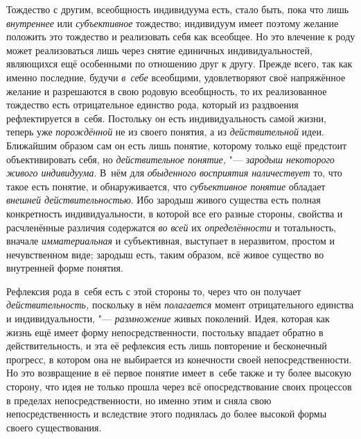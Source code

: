 Тождество с другим, всеобщность индивидуума есть, стало быть,
пока что лишь {\em внутреннее}
или {\em субъективное}
тождество; индивидуум имеет поэтому желание положить это
тождество и реализовать себя как всеобщее. Но это влечение к роду может
реализоваться лишь через снятие единичных индивидуальностей, являющихся ещё
особенными по отношению друг к другу. Прежде всего, так как именно
последние, будучи {\em в~себе}
всеобщими, удовлетворяют своё напряжённое желание и
разрешаются в свою родовую всеобщность, то их реализованное тождество есть
отрицательное единство рода, который из раздвоения рефлектируется в~себя.
Постольку он есть индивидуальность самой жизни, теперь уже
{\em порождённой} не из
своего понятия, а из
{\em действительной}
идеи. Ближайшим образом сам он есть лишь
понятие, которому только ещё предстоит объективировать себя, но
{\em действительное понятие,} "---
{\em зародыш некоторого живого
индивидуума}. В~нём для
{\em обыденного восприятия
наличествует} то, что такое есть понятие, и обнаруживается,
что {\em субъективное понятие}
обладает {\em внешней
действительностью}. Ибо зародыш живого существа есть полная
конкретность индивидуальности, в которой все его разные стороны, свойства и
расчленённые различия содержатся {\em во
всей} их
{\em определённости} и
тотальность, вначале
{\em имматериальная} и
субъективная, выступает в неразвитом, простом и нечувственном виде; зародыш
есть, таким образом, всё живое существо во внутренней форме понятия.

Рефлексия рода в~себя есть с этой стороны то, через что он
получает {\em действительность,}
поскольку в нём
{\em полагается} момент
отрицательного единства и индивидуальности, "---
{\em размножение} живых
поколений. Идея, которая как жизнь ещё имеет форму непосредственности,
постольку впадает обратно в действительность, и эта её рефлексия есть лишь
повторение и бесконечный прогресс, в котором она не выбирается из
конечности своей непосредственности. Но это возвращение в её первое понятие
имеет в~себе также и ту более высокую сторону, что идея не только прошла
через всё опосредствование своих процессов в пределах непосредственности,
но именно этим и сняла свою непосредственность и вследствие этого поднялась
до более высокой формы своего существования.

